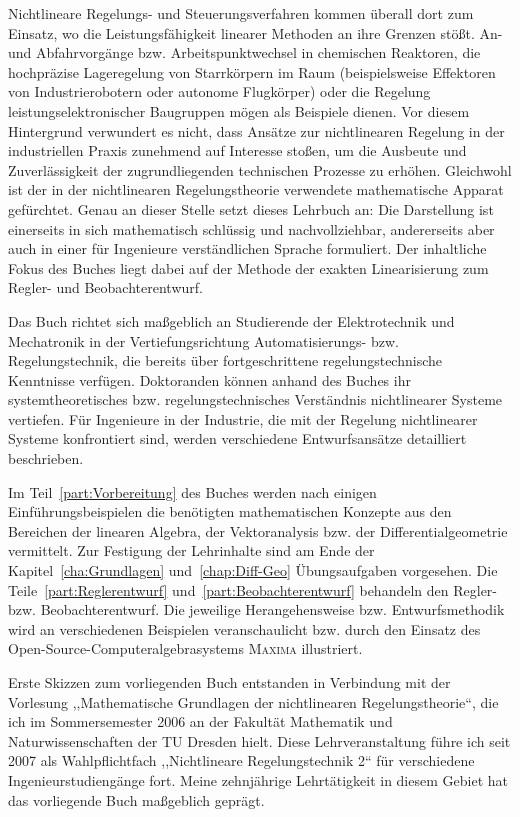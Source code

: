 
\preface{}

Nichtlineare Regelungs- und Steuerungsverfahren kommen überall dort
zum Einsatz, wo die Leistungsfähigkeit linearer Methoden an ihre Grenzen
stößt. An- und Abfahrvorgänge bzw. Arbeitspunktwechsel in chemischen
Reaktoren, die hochpräzise Lageregelung von Starrkörpern im Raum (beispielsweise
Effektoren von Industrierobotern oder autonome Flugkörper) oder die
Regelung leistungselektronischer Baugruppen mögen als Beispiele dienen.
Vor diesem Hintergrund verwundert es nicht, dass Ansätze zur nichtlinearen
Regelung in der industriellen Praxis zunehmend auf Interesse stoßen,
um die Ausbeute und Zuverlässigkeit der zugrundliegenden technischen
Prozesse zu erhöhen. Gleichwohl ist der in der nichtlinearen Regelungstheorie
verwendete mathematische Apparat gefürchtet. Genau an dieser Stelle
setzt dieses Lehrbuch an: Die Darstellung ist einerseits in sich mathematisch
schlüssig und nachvollziehbar, andererseits aber auch in einer für
Ingenieure verständlichen Sprache formuliert. Der inhaltliche Fokus
des Buches liegt dabei auf der Methode der exakten Linearisierung
zum Regler- und Beobachterentwurf.

Das Buch richtet sich maßgeblich an Studierende der Elektrotechnik
und Mechatronik in der Vertiefungsrichtung Automatisierungs- bzw.
Regelungstechnik, die bereits über fortgeschrittene regelungstechnische
Kenntnisse verfügen. Doktoranden können anhand des Buches ihr systemtheoretisches
bzw. regelungstechnisches Verständnis nichtlinearer Systeme vertiefen.
Für Ingenieure in der Industrie, die mit der Regelung nichtlinearer
Systeme konfrontiert sind, werden verschiedene Entwurfsansätze detailliert
beschrieben.

Im Teil~\ref{part:Vorbereitung} des Buches werden nach einigen Einführungsbeispielen
die benötigten mathematischen Konzepte aus den Bereichen der linearen
Algebra, der Vektoranalysis bzw. der Differentialgeometrie vermittelt.
Zur Festigung der Lehrinhalte sind am Ende der Kapitel~\ref{cha:Grundlagen}
und~\ref{chap:Diff-Geo} Übungsaufgaben vorgesehen. Die Teile~\ref{part:Reglerentwurf}
und~\ref{part:Beobachterentwurf} behandeln den Regler- bzw. Beobachterentwurf.
Die jeweilige Herangehensweise bzw. Entwurfsmethodik wird an verschiedenen
Beispielen veranschaulicht bzw. durch den Einsatz des Open-Source-Computeralgebrasystems
\textsc{Maxima} illustriert.

Erste Skizzen zum vorliegenden Buch entstanden in Verbindung mit der
Vorlesung ,,Mathematische Grundlagen der nichtlinearen Regelungstheorie``,
die ich im Sommersemester 2006 an der Fakultät Mathematik und Naturwissenschaften
der TU Dresden hielt. Diese Lehrveranstaltung führe ich seit 2007
als Wahlpflichtfach ,,Nichtlineare Regelungstechnik 2`` für verschiedene
Ingenieurstudiengänge fort. Meine zehnjährige Lehrtätigkeit in diesem
Gebiet hat das vorliegende Buch maßgeblich geprägt.

